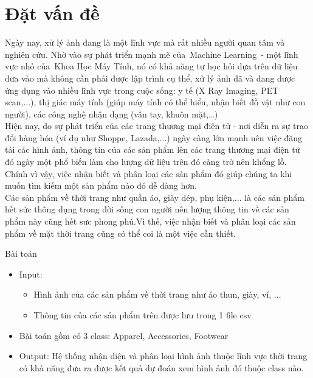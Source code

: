 \section{Đặt vấn đề}
Ngày nay, xử lý ảnh đang là một lĩnh vực mà rất nhiều người quan tâm và nghiên cứu. Nhờ vào sự phát triển mạnh mẽ của Machine Learning - một lĩnh vực nhỏ của Khoa Học Máy Tính, nó có khả năng tự học hỏi dựa trên dữ liệu đưa vào mà không cần phải được lập trình cụ thể, xử lý ảnh đã và đang được ứng dụng vào nhiều lĩnh vực trong cuộc sống: y tế (X Ray Imaging, PET scan,...), thị giác máy tính (giúp máy tính có thể hiểu, nhận biết đồ vật như con người), các công nghệ nhận dạng (vân tay, khuôn mặt,…)\\

Hiện nay, do sự phát triển của các trang thương mại điện tử - nơi diễn ra sự trao đổi hàng hóa (ví dụ như Shoppe, Lazada,...) ngày càng lớn mạnh nên việc đăng tải các hình ảnh, thông tin của các sản phẩm lên các trang thương mại điện tử đó ngày một phổ biến làm cho lượng dữ liệu trên đó càng trở nên khổng lồ. Chính vì vậy, việc nhận biết và phân loại các sản phẩm đó giúp chúng ta khi muốn tìm kiếm một sản phẩm nào đó dễ dàng hơn.\\     

Các sản phẩm về thời trang như quần áo, giày dép, phụ kiện,... là các sản phẩm hết sức thông dụng trong đời sống con người nên lượng thông tin về các sản phẩm này cũng hết sưc phong phú.Vì thế, việc nhận biết và phân loại các sản phẩm về mặt thời trang cũng có thể coi là một việc cần thiết.\\

\begin{block}{Bài toán}
\begin{itemize}
    \item Input: 
    \begin{itemize}
        \item Hình ảnh của các sản phẩm về thời trang như áo thun, giày, ví, ...
        \item Thông tin của các sản phẩm trên được lưu trong 1 file csv
    \end{itemize}

    \item Bài toán gồm có 3 class: Apparel, Accessories, Footwear

    \item Output: Hệ thống nhận diện và phân loại hình ảnh thuộc lĩnh vực thời trang có khả năng đưa ra được kết quả dự đoán xem hình ảnh đó thuộc class nào.
\end{itemize}
\end{block}